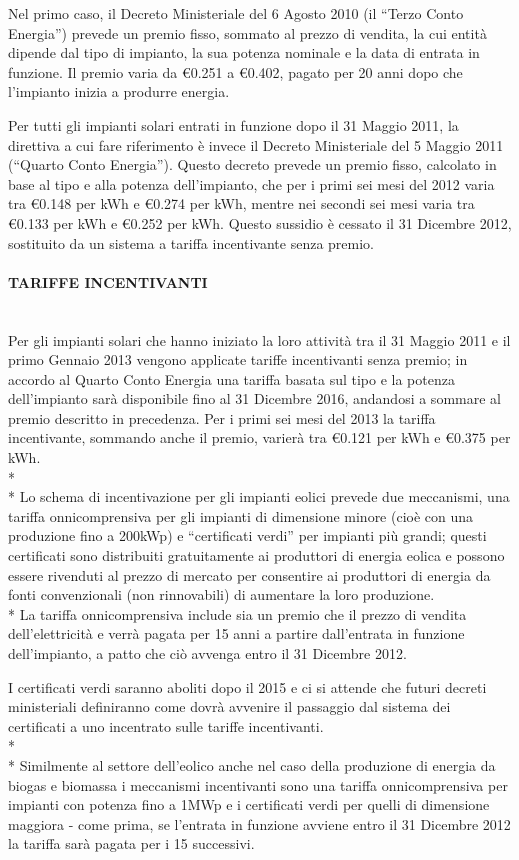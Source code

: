 \documentclass[12pt,a4paper,openright,twoside]{report}
\newcommand{\myparagraph}[1]{\paragraph{#1}\mbox{}\\}
\begin{document}
Nel primo caso, il Decreto Ministeriale del 6 Agosto 2010 (il ``Terzo Conto Energia'') prevede un premio fisso, sommato al prezzo di vendita, la cui entità dipende dal tipo di impianto, la sua potenza nominale e la data di entrata in funzione. Il premio varia da \euro0.251 a \euro0.402, pagato per 20 anni dopo che l'impianto inizia a produrre energia.

Per tutti gli impianti solari entrati in funzione dopo il 31 Maggio 2011, la direttiva a cui fare riferimento è invece il Decreto Ministeriale del 5 Maggio 2011 (``Quarto Conto Energia''). Questo decreto prevede un premio fisso, calcolato in base al tipo e alla potenza dell'impianto, che per i primi sei mesi del 2012 varia tra \euro0.148 per kWh e \euro0.274 per kWh, mentre nei secondi sei mesi varia tra \euro0.133 per kWh e \euro0.252 per kWh. Questo sussidio è cessato il 31 Dicembre 2012, sostituito da un sistema a tariffa incentivante senza premio.

\myparagraph{TARIFFE INCENTIVANTI}
Per gli impianti solari che hanno iniziato la loro attività tra il 31 Maggio 2011 e il primo Gennaio 2013 vengono applicate tariffe incentivanti senza premio; in accordo al Quarto Conto Energia una tariffa basata sul tipo e la potenza dell'impianto sarà disponibile fino al 31 Dicembre 2016, andandosi a sommare al premio descritto in precedenza. Per i primi sei mesi del 2013 la tariffa incentivante, sommando anche il premio, varierà tra \euro0.121 per kWh e \euro0.375 per kWh.
\\*\\*
Lo schema di incentivazione per gli impianti eolici prevede due meccanismi, una tariffa onnicomprensiva per gli impianti di dimensione minore (cioè con una produzione fino a 200kWp) e ``certificati verdi'' per impianti più grandi; questi certificati sono distribuiti gratuitamente ai produttori di energia eolica e possono essere rivenduti al prezzo di mercato per consentire ai produttori di energia da fonti convenzionali (non rinnovabili) di aumentare la loro produzione.\\* La tariffa onnicomprensiva include sia un premio che il prezzo di vendita dell'elettricità e verrà pagata per 15 anni a partire dall'entrata in funzione dell'impianto, a patto che ciò avvenga entro il 31 Dicembre 2012.

I certificati verdi saranno aboliti dopo il 2015 e ci si attende che futuri decreti ministeriali definiranno come dovrà avvenire il passaggio dal sistema dei certificati a uno incentrato sulle tariffe incentivanti.
\\*\\* 
Similmente al settore dell'eolico anche nel caso della produzione di energia da biogas e biomassa i meccanismi incentivanti sono una tariffa onnicomprensiva per impianti con potenza fino a 1MWp e i certificati verdi per quelli di dimensione maggiora - come prima, se l'entrata in funzione avviene entro il 31 Dicembre 2012 la tariffa sarà pagata per i 15 successivi.
\end{document}
